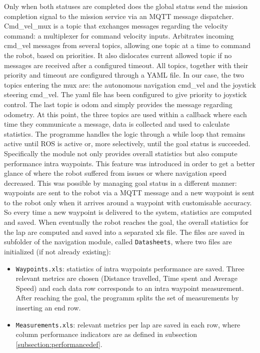 Only when both statuses are completed does the global status send the mission completion signal to the mission service via an MQTT message dispatcher. 
Cmd\_vel\_mux is a topic that exchanges messages regarding the velocity command: a multiplexer for command velocity inputs. Arbitrates incoming cmd\_vel messages from several topics, allowing one topic at a time to command the robot, based on priorities. It also dislocates current allowed topic if no messages are received after a configured timeout. All topics, together with their priority and timeout are configured through a YAML file. In our case, the two topics entering the mux are: the autonomous navigation cmd\_vel and the joystick steering cmd\_vel. The yaml file has been configured to give priority to joystick control. The last topic is odom and simply provides the message regarding odometry.
At this point, the three topics are used within a callback where each time they communicate a message, data is collected and used to calculate statistics. The programme handles the logic through a while loop that remains active until ROS is active or, more selectively, until the goal status is succeeded.
Specifically the module not only provides overall statistics but also compute performance intra waypoints. This feature was introduced in order to get a better glance of where the robot suffered from issues or where navigation speed decreased. This was possible by managing goal status in a different manner: waypoints are sent to the robot via a MQTT message and a new waypoint is sent to the robot only when it arrives around a waypoint with customisable accuracy. So every time a new waypoint is delivered to the system, statistics are computed and saved. When eventually the robot reaches the goal, the overall statistics for the lap are computed and saved into a separated xls file.
The files are saved in subfolder of the navigation module, called \texttt{Datasheets}, where two files are initialized (if not already existing): 
\begin{itemize}
    \item \texttt{Waypoints.xls}: statistics of intra waypoints performance are saved. Three relevant metrics are chosen (Distance travelled, Time spent and Average Speed) and each data row corresponds to an intra waypoint measurement. After reaching the goal, the programm splits the set of measurements by inserting an end row. 
    \item\texttt{Measurements.xls}: relevant metrics per lap are saved in each row, where column performance indicators are as defined in subsection \ref{subsection:performancedef}.
\end{itemize}
    
